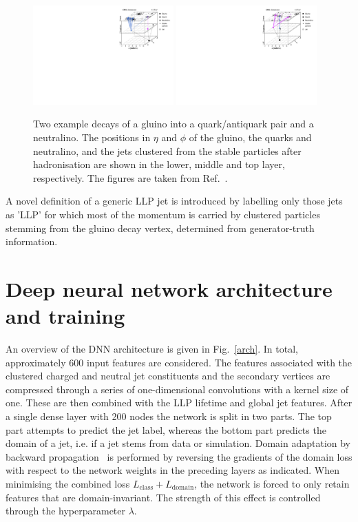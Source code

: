 \documentclass{webofc}
\begin{document}
\begin{figure}[!ht]
\includegraphics[width=0.48\textwidth]{figs/decay1.pdf}\hspace{0.03\textwidth}
\includegraphics[width=0.48\textwidth]{figs/decay2.pdf}
\centering
\caption{Two example decays of a gluino into a quark/antiquark pair and a neutralino. The positions in $\eta$ and $\phi$ of the gluino, the quarks and neutralino, and the jets clustered from the stable particles after hadronisation are shown in the lower, middle and top layer, respectively. The figures are taken from Ref.~\cite{CMS-EXO-19-011}.}
\label{decay}
\end{figure}

A novel definition of a generic LLP jet is introduced by labelling only those jets as 'LLP' for which most of the momentum is carried by clustered particles stemming from the gluino decay vertex, determined from generator-truth information.


\section{Deep neural network architecture and training}
\label{dnn}

An overview of the DNN architecture is given in Fig.~\ref{arch}. In total, approximately 600 input features are considered. The features associated with the clustered charged and neutral jet constituents and the secondary vertices are compressed through a series of one-dimensional convolutions with a kernel size of one. These are then combined with the LLP lifetime and global jet features. After a single dense layer with 200 nodes the network is split in two parts. The top part attempts to predict the jet label, whereas the bottom part predicts the domain of a jet, i.e. if a jet stems from data or simulation. Domain adaptation by backward propagation~\cite{da} is performed by reversing the gradients of the domain loss with respect to the network weights in the preceding layers as indicated. When minimising the combined loss $L_\mathrm{class}+L_\mathrm{domain}$, the network is forced to only retain features that are domain-invariant. The strength of this effect is controlled through the hyperparameter $\lambda$.
\end{document}
